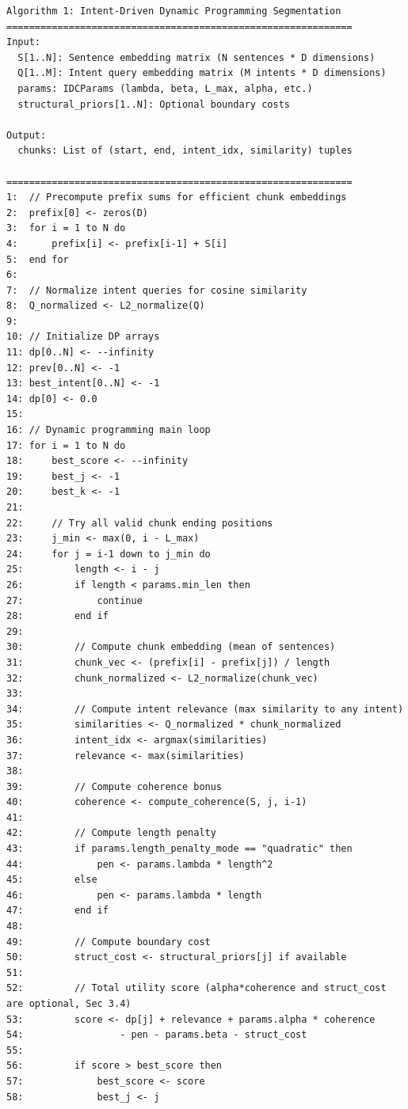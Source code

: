 \documentclass[12pt,a4paper]{report}
\begin{document}
\begin{verbatim}
Algorithm 1: Intent-Driven Dynamic Programming Segmentation
=============================================================
Input:
  S[1..N]: Sentence embedding matrix (N sentences * D dimensions)
  Q[1..M]: Intent query embedding matrix (M intents * D dimensions)
  params: IDCParams (lambda, beta, L_max, alpha, etc.)
  structural_priors[1..N]: Optional boundary costs
  
Output:
  chunks: List of (start, end, intent_idx, similarity) tuples

=============================================================
1:  // Precompute prefix sums for efficient chunk embeddings
2:  prefix[0] <- zeros(D)
3:  for i = 1 to N do
4:      prefix[i] <- prefix[i-1] + S[i]
5:  end for
6:
7:  // Normalize intent queries for cosine similarity
8:  Q_normalized <- L2_normalize(Q)
9:
10: // Initialize DP arrays
11: dp[0..N] <- --infinity
12: prev[0..N] <- -1
13: best_intent[0..N] <- -1
14: dp[0] <- 0.0
15:
16: // Dynamic programming main loop
17: for i = 1 to N do
18:     best_score <- --infinity
19:     best_j <- -1
20:     best_k <- -1
21:     
22:     // Try all valid chunk ending positions
23:     j_min <- max(0, i - L_max)
24:     for j = i-1 down to j_min do
25:         length <- i - j
26:         if length < params.min_len then
27:             continue
28:         end if
29:         
30:         // Compute chunk embedding (mean of sentences)
31:         chunk_vec <- (prefix[i] - prefix[j]) / length
32:         chunk_normalized <- L2_normalize(chunk_vec)
33:         
34:         // Compute intent relevance (max similarity to any intent)
35:         similarities <- Q_normalized * chunk_normalized
36:         intent_idx <- argmax(similarities)
37:         relevance <- max(similarities)
38:         
39:         // Compute coherence bonus
40:         coherence <- compute_coherence(S, j, i-1)
41:         
42:         // Compute length penalty
43:         if params.length_penalty_mode == "quadratic" then
44:             pen <- params.lambda * length^2
45:         else
46:             pen <- params.lambda * length
47:         end if
48:         
49:         // Compute boundary cost
50:         struct_cost <- structural_priors[j] if available
51:         
52:         // Total utility score (alpha*coherence and struct_cost are optional, Sec 3.4)
53:         score <- dp[j] + relevance + params.alpha * coherence
54:                 - pen - params.beta - struct_cost
55:         
56:         if score > best_score then
57:             best_score <- score
58:             best_j <- j

\end{verbatim}
\end{document}

